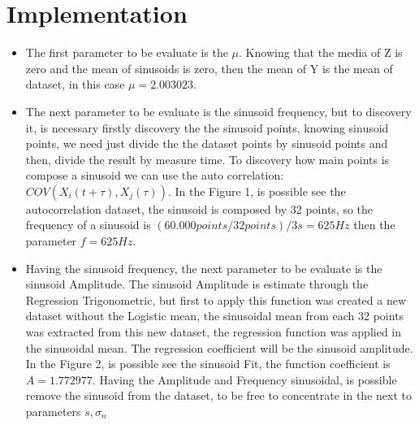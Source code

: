 \documentclass[conference]{IEEEtran}
\begin{document}
\section{Implementation}

\begin{itemize}

\item  The first parameter to be evaluate is the \begin{math} \mu \end{math}. Knowing that the media of Z is zero and the mean of sinusoids is zero, then the mean of Y is the mean of dataset, in this case \begin{math} \mu = 2.003023 \end{math}. 
\bigskip
\item  The next parameter to be evaluate is the sinusoid frequency, but to discovery it, is necessary firstly discovery the the sinusoid points, knowing sinusoid points, we need just divide the the dataset points by sinusoid points and then, divide the result by measure time. To discovery how main points is compose a sinusoid we can use the auto correlation: \begin{math} COV(X_i(t + \tau), X_j(\tau))\end{math}. In the Figure 1, is possible see the autocorrelation dataset, the sinusoid is composed by 32 points, so the frequency of a sinusoid is \begin{math}
(60.000points/32points)/3s = 625 Hz  \end{math} then the parameter \begin{math} f=625Hz\end{math}.
\bigskip
\item Having the sinusoid frequency, the next parameter to be evaluate is the sinusoid Amplitude. The sinusoid Amplitude is estimate through the Regression Trigonometric, but first to apply this function was created a new dataset without the Logistic mean, the sinusoidal mean from each 32 points was extracted from this new dataset, the regression function was applied in the sinusoidal mean. The regression coefficient will be the sinusoid amplitude. In the Figure 2, is possible see the sinusoid Fit, the function coefficient is \begin{math} A = 1.772977\end{math}. Having the Amplitude and Frequency sinusoidal, is possible remove the sinusoid from the dataset, to be free to concentrate in the next to parameters  \begin{math} s, \sigma_n \end{math}

\end{itemize}
\end{document}
